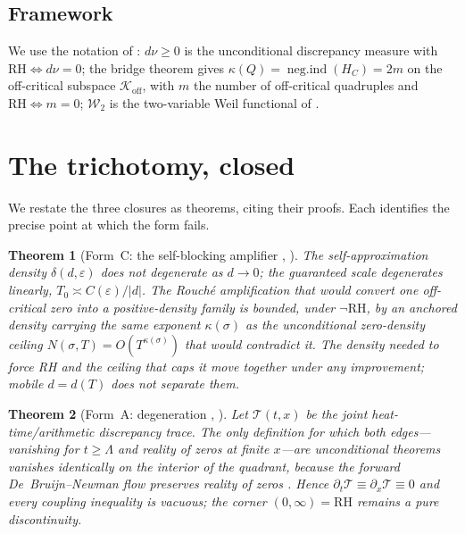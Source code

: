 \documentclass[11pt]{amsart}
\newtheorem{theorem}{Theorem}[section]
\theoremstyle{definition}
\theoremstyle{remark}
\newcommand{\RH}{\mathrm{RH}}
\newcommand{\Koff}{\mathcal{K}_{\mathrm{off}}}
\newcommand{\negind}{\operatorname{neg.ind}}
\newcommand{\Wtwo}{\mathcal{W}_2}
\newcommand{\dnu}{d\nu}
\begin{document}
\subsection{Framework}
We use the notation of \cite{P39,P40,P41,P42}: $\dnu\ge0$ is the
unconditional discrepancy measure with $\RH\iff\dnu=0$; the bridge theorem
\cite{P35} gives $\kappa(Q)=\negind(H_C)=2m$ on the off-critical subspace
$\Koff$, with $m$ the number of off-critical quadruples and $\RH\iff m=0$;
$\Wtwo$ is the two-variable Weil functional of \cite[]{P40}.

\section{The trichotomy, closed}\label{sec:trichotomy}

We restate the three closures as theorems, citing their proofs. Each
identifies the precise point at which the form fails.

\begin{theorem}[Form~C: the self-blocking amplifier {\cite[]{P40}, \cite[\S2]{P42}}]
\label{thm:C}
The self-approximation density $\delta(d,\varepsilon)$ does not degenerate as
$d\to0$; the guaranteed scale degenerates linearly,
$T_0\asymp C(\varepsilon)/|d|$. The Rouch\'e amplification that would convert
one off-critical zero into a positive-density family is bounded, under
$\neg\RH$, by an anchored density carrying the \emph{same} exponent
$\kappa(\sigma)$ as the unconditional zero-density ceiling
$N(\sigma,T)=O(T^{\kappa(\sigma)})$ that would contradict it. The density
needed to force RH and the ceiling that caps it move together under any
improvement; mobile $d=d(T)$ does not separate them.
\end{theorem}

\begin{theorem}[Form~A: degeneration {\cite[]{P40}, \cite[\S3]{P42}}]
\label{thm:A}
Let $\mathcal{T}(t,x)$ be the joint heat-time/arithmetic discrepancy trace.
The only definition for which both edges---vanishing for $t\ge\Lambda$ and
reality of zeros at finite $x$---are unconditional theorems vanishes
identically on the interior of the quadrant, because the forward
De~Bruijn--Newman flow preserves reality of zeros \cite{deBruijn50}. Hence
$\partial_t\mathcal{T}\equiv\partial_x\mathcal{T}\equiv0$ and every coupling
inequality is vacuous; the corner $(0,\infty)=\RH$ remains a pure
discontinuity.
\end{theorem}
\end{document}
